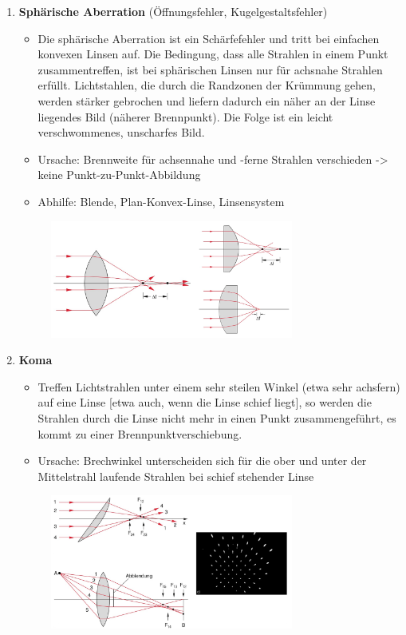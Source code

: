 \documentclass[a4paper, 11pt, ngerman, parskip=half-]{scrartcl}
\begin{document}
\begin{enumerate}
    \item \textbf{Sphärische Aberration} (Öffnungsfehler, Kugelgestaltsfehler)
          \begin{itemize}
              \item Die sphärische Aberration ist ein Schärfefehler und tritt bei einfachen konvexen Linsen auf.
                    Die Bedingung, dass alle Strahlen in einem Punkt zusammentreffen, ist bei sphärischen Linsen nur für achsnahe
                    Strahlen erfüllt. Lichtstahlen, die durch die Randzonen der Krümmung gehen, werden stärker gebrochen und liefern dadurch
                    ein näher an der Linse liegendes Bild (näherer Brennpunkt). Die Folge ist ein leicht verschwommenes, unscharfes Bild.
              \item Ursache: Brennweite für achsennahe und -ferne Strahlen verschieden -> keine Punkt-zu-Punkt-Abbildung
              \item Abhilfe: Blende, Plan-Konvex-Linse, Linsensystem
          \end{itemize}
          \begin{figure}[H]
              \centering
              \includegraphics[width=8cm]{image/18/fehler_sphaerisch.png}
          \end{figure}

    \item \textbf{Koma}
          \begin{itemize}
              \item Treffen Lichtstrahlen unter einem sehr steilen Winkel (etwa sehr achsfern) auf eine Linse [etwa auch, wenn die Linse schief liegt],
                    so werden die Strahlen durch die Linse nicht mehr in einen Punkt zusammengeführt, es kommt zu einer Brennpunktverschiebung.
              \item Ursache: Brechwinkel unterscheiden sich für die ober und unter der Mittelstrahl laufende Strahlen bei schief stehender Linse
          \end{itemize}
          \begin{figure}[H]
              \centering
              \includegraphics[width=8cm]{image/18/fehler_koma.png}
          \end{figure}



\end{enumerate}
\end{document}
